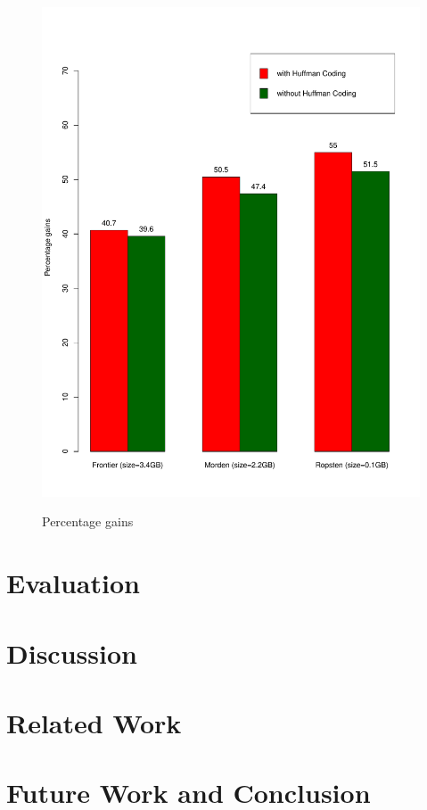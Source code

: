 \documentclass[10pt,numbers]{sigplanconf}
\theoremstyle{definition}
\begin{document}
\begin{figure}[!t]
\begin{floatrow}
{	\includegraphics[scale=0.45]{plots/customgains}
}{ \caption{Percentage gains}
\label{fig:origvscustom}
}
\end{floatrow}
\end{figure}

\section{Evaluation}\label{sec:evaluation}


\section{Discussion}\label{sec:discuss}


\section{Related Work} \label{sec:related}


\section{Future Work and Conclusion}\label{sec:future}


%






\appendix
\end{document}
